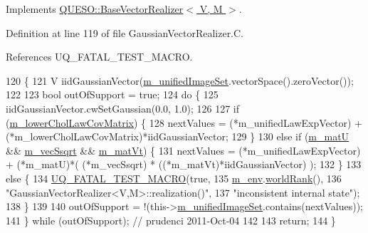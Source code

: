 Implements \hyperlink{class_q_u_e_s_o_1_1_base_vector_realizer_a6845173dd79a80ae11c86cde26e55817}{Q\-U\-E\-S\-O\-::\-Base\-Vector\-Realizer$<$ V, M $>$}.



Definition at line 119 of file Gaussian\-Vector\-Realizer.\-C.



References U\-Q\-\_\-\-F\-A\-T\-A\-L\-\_\-\-T\-E\-S\-T\-\_\-\-M\-A\-C\-R\-O.


\begin{DoxyCode}
120 \{
121   V iidGaussianVector(\hyperlink{class_q_u_e_s_o_1_1_base_vector_realizer_a6c705235d28a3c12641da57cde948872}{m\_unifiedImageSet}.vectorSpace().zeroVector());
122 
123   \textcolor{keywordtype}{bool} outOfSupport = \textcolor{keyword}{true};
124   \textcolor{keywordflow}{do} \{
125     iidGaussianVector.cwSetGaussian(0.0, 1.0);
126 
127     \textcolor{keywordflow}{if} (\hyperlink{class_q_u_e_s_o_1_1_gaussian_vector_realizer_ac5cc90b95dddd02a987f45af652f4495}{m\_lowerCholLawCovMatrix}) \{
128       nextValues = (*m\_unifiedLawExpVector) + (*m\_lowerCholLawCovMatrix)*iidGaussianVector;
129     \}
130     \textcolor{keywordflow}{else} \textcolor{keywordflow}{if} (\hyperlink{class_q_u_e_s_o_1_1_gaussian_vector_realizer_a62aebd74fe00824ceed9724b8c41cfa7}{m\_matU} && \hyperlink{class_q_u_e_s_o_1_1_gaussian_vector_realizer_a473a7c1e61dd0b311bb7da6c244cb53d}{m\_vecSsqrt} && \hyperlink{class_q_u_e_s_o_1_1_gaussian_vector_realizer_aa121afe8cf67cea2a52552b4d12d57b8}{m\_matVt}) \{
131       nextValues = (*m\_unifiedLawExpVector) + (*m\_matU)*( (*m\_vecSsqrt) * ((*m\_matVt)*iidGaussianVector) );
132     \}
133     \textcolor{keywordflow}{else} \{
134       \hyperlink{_defines_8h_a56d63d18d0a6d45757de47fcc06f574d}{UQ\_FATAL\_TEST\_MACRO}(\textcolor{keyword}{true},
135                           \hyperlink{class_q_u_e_s_o_1_1_base_vector_realizer_acde246c52f82d8ed687d91cfac14c29c}{m\_env}.\hyperlink{class_q_u_e_s_o_1_1_base_environment_a78b57112bbd0e6dd0e8afec00b40ffa7}{worldRank}(),
136                           \textcolor{stringliteral}{"GaussianVectorRealizer<V,M>::realization()"},
137                           \textcolor{stringliteral}{"inconsistent internal state"});
138     \}
139 
140     outOfSupport = !(this->\hyperlink{class_q_u_e_s_o_1_1_base_vector_realizer_a6c705235d28a3c12641da57cde948872}{m\_unifiedImageSet}.contains(nextValues));
141   \} \textcolor{keywordflow}{while} (outOfSupport); \textcolor{comment}{// prudenci 2011-Oct-04}
142 
143   \textcolor{keywordflow}{return};
144 \}
\end{DoxyCode}
